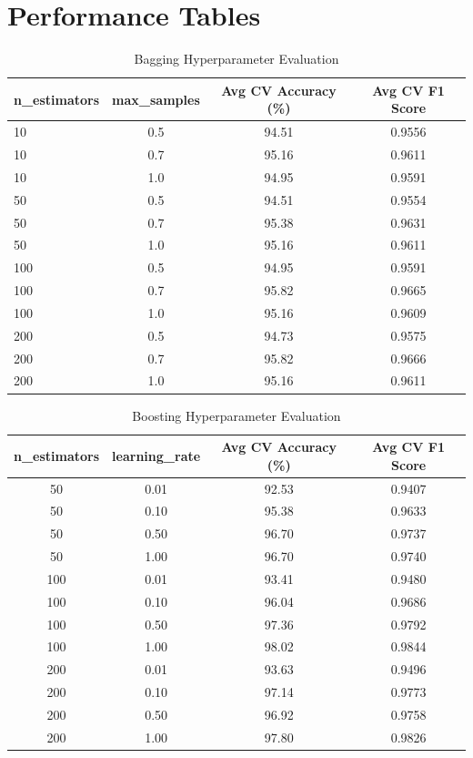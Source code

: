 \documentclass[11pt]{article}
\begin{document}
\section{Performance Tables}
\begin{table}[H]
\centering
\renewcommand{\arraystretch}{1.3}
\caption{Bagging Hyperparameter Evaluation}
\begin{tabular}{|l|c|c|c|}
\hline
n\_estimators & max\_samples & Avg CV Accuracy (\%) & Avg CV F1 Score \\
\hline
10 & 0.5 & 94.51 & 0.9556 \\
10 & 0.7 & 95.16 & 0.9611 \\
10 & 1.0 & 94.95 & 0.9591 \\
50 & 0.5 & 94.51 & 0.9554 \\
50 & 0.7 & 95.38 & 0.9631 \\
50 & 1.0 & 95.16 & 0.9611 \\
100 & 0.5 & 94.95 & 0.9591 \\
100 & 0.7 & 95.82 & 0.9665 \\
100 & 1.0 & 95.16 & 0.9609 \\
200 & 0.5 & 94.73 & 0.9575 \\
200 & 0.7 & 95.82 & 0.9666 \\
200 & 1.0 & 95.16 & 0.9611 \\
\hline
\end{tabular}
\end{table}

\begin{table}[H]
\centering
\renewcommand{\arraystretch}{1.3}
\caption{Boosting Hyperparameter Evaluation}
\begin{tabular}{|c|c|c|c|}
\hline
n\_estimators & learning\_rate & Avg CV Accuracy (\%) & Avg CV F1 Score \\
\hline
50 & 0.01 & 92.53 & 0.9407 \\
50 & 0.10 & 95.38 & 0.9633 \\
50 & 0.50 & 96.70 & 0.9737 \\
50 & 1.00 & 96.70 & 0.9740 \\
100 & 0.01 & 93.41 & 0.9480 \\
100 & 0.10 & 96.04 & 0.9686 \\
100 & 0.50 & 97.36 & 0.9792 \\
100 & 1.00 & 98.02 & 0.9844 \\
200 & 0.01 & 93.63 & 0.9496 \\
200 & 0.10 & 97.14 & 0.9773 \\
200 & 0.50 & 96.92 & 0.9758 \\
200 & 1.00 & 97.80 & 0.9826 \\
 \hline
\end{tabular}
\end{table}
\end{document}
